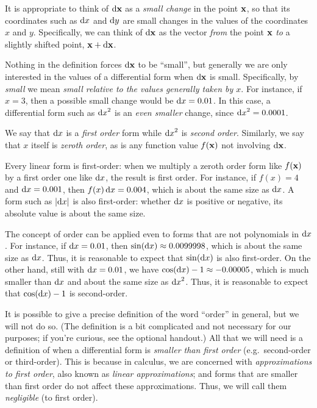 \documentclass[12pt]{amsart}
\begin{document}
It is appropriate to think of ${\mathrm{d} \mathbf{x}}$ as a \emph{small change} in the point $\mathbf{x}$, so that its coordinates such as ${\mathrm{d} x}$ and ${\mathrm{d} y}$ are small changes in the values of the coordinates $x$ and $y$.
Specifically, we can think of ${\mathrm{d} \mathbf{x}}$ as the vector \emph{from} the point $\mathbf{x}$ \emph{to} a slightly shifted point, $\mathbf{x}+{\mathrm{d} \mathbf{x}}$.
\begin{center}
\end{center}
Nothing in the definition forces ${\mathrm{d} \mathbf{x}}$ to be ``small'', but generally we are only interested in the values of a differential form when ${\mathrm{d} \mathbf{x}}$ is small.
Specifically, by \emph{small} we mean \emph{small relative to the values generally taken by $x$}.
For instance, if $x=3$, then a possible small change would be ${\mathrm{d} x} = 0.01$.
In this case, a differential form such as ${\mathrm{d} x}^2$ is an \emph{even smaller} change, since ${\mathrm{d} x}^2 = 0.0001$.

We say that ${\mathrm{d} x}$ is a \emph{first order} form while ${\mathrm{d} x}^2$ is \emph{second order}.
Similarly, we say that $x$ itself is \emph{zeroth order}, as is any function value $f(\mathbf{x})$ not involving ${\mathrm{d} \mathbf{x}}$.

Every linear form is first-order: when we multiply a zeroth order form like $f(\mathbf{x})$ by a first order one like ${\mathrm{d} x}$, the result is first order.
For instance, if $f(x) = 4$ and ${\mathrm{d} x} = 0.001$, then $f(x)\,{\mathrm{d} x} = 0.004$, which is about the same size as ${\mathrm{d} x}$.
A form such as $|{\mathrm{d} x}|$ is also first-order: whether ${\mathrm{d} x}$ is positive or negative, its absolute value is about the same size.

The concept of order can be applied even to forms that are not polynomials in ${\mathrm{d} x}$.
For instance, if ${\mathrm{d} x}=0.01$, then $\sin({\mathrm{d} x}) \approx 0.0099998$, which is about the same size as ${\mathrm{d} x}$.
Thus, it is reasonable to expect that $\sin({\mathrm{d} x})$ is also first-order.
On the other hand, still with ${\mathrm{d} x}=0.01$, we have $\cos({\mathrm{d} x}) - 1 \approx -0.00005$, which is much smaller than ${\mathrm{d} x}$ and about the same size as ${\mathrm{d} x}^2$.
Thus, it is reasonable to expect that $\cos({\mathrm{d} x}) - 1$ is second-order.

It is possible to give a precise definition of the word ``order'' in general, but we will not do so.
(The definition is a bit complicated and not necessary for our purposes; if you're curious, see the optional handout.)
All that we will need is a definition of when a differential form is \emph{smaller than first order} (e.g.\ second-order or third-order).
This is because in calculus, we are concerned with \emph{approximations to first order}, also known as \emph{linear approximations}; and forms that are smaller than first order do not affect these approximations.
Thus, we will call them \emph{negligible} (to first order).
\end{document}
